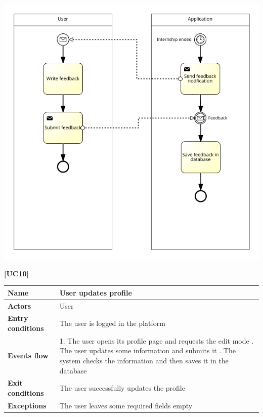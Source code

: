\documentclass[11pt,twoside]{article}
\begin{document}
\begin{center}
\includegraphics[width=\textwidth]{Images/UC9}
\end{center}

\newpage

\large{\textbf{[UC10]}} \\
\begin{table}[H]
\begin{tabular}{| p{} | p{} |}
\hline
\textbf{Name}
& User updates profile \\
\hline
\textbf{Actors}
& User \\
\hline
\textbf{Entry conditions}
& The user is logged in the platform \\
\hline
\textbf{Events flow}
& 1. The user opens its profile page and requests the edit mode \newline
2. The user updates some information and submits it \newline
3. The system checks the information and then saves it in the database \\
\hline
\textbf{Exit conditions}
& The user successfully updates the profile \\
\hline
\textbf{Exceptions}
& The user leaves some required fields empty \\
\hline
\end{tabular}
\end{table}
\end{document}
